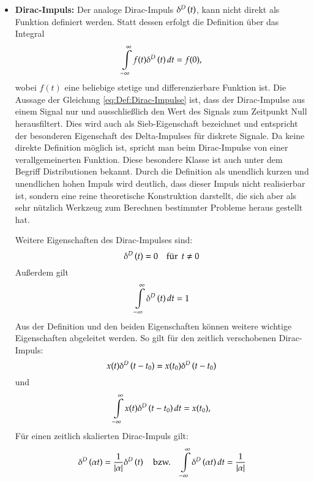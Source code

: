 \begin{itemize}
{    }
    \item{{\bf Dirac-Impuls:} Der analoge Dirac-Impuls $\Dirac{t}$,
kann nicht direkt als Funktion definiert werden. Statt dessen
erfolgt die Definition über das Integral
\begin{equation}\label{eq:Def:Dirac-Impulse}
   \int\limits_{-\infty}^{\infty}f(t)\Dirac{t} dt = f(0),
\end{equation}
wobei $f(t)$ eine beliebige stetige und differenzierbare Funktion
ist. Die Aussage der Gleichung \ref{eq:Def:Dirac-Impulse} ist, dass der Dirac-Impulse aus
einem Signal nur und ausschließlich den Wert des Signals zum
Zeitpunkt Null herausfiltert. Dies wird auch als Sieb-Eigenschaft
bezeichnet und entspricht der besonderen Eigenschaft des
Delta-Impulses für diskrete Signale. Da keine direkte Definition
möglich ist, spricht man beim Dirac-Impulse von einer
verallgemeinerten Funktion. Diese besondere Klasse ist auch unter
dem Begriff Distributionen bekannt. Durch die Definition als unendlich kurzen
und unendlichen hohen Impuls wird deutlich, dass dieser Impuls nicht
realisierbar ist, sondern eine reine theoretische Konstruktion darstellt, die
sich aber als sehr nützlich Werkzeug zum Berechnen bestimmter Probleme heraus gestellt hat.

Weitere Eigenschaften des Dirac-Impulses sind:
\begin{equation}\label{eq:Eigenschaft1:Dirac}
    \Dirac{t} = 0 \fuer t \neq 0
\end{equation}
Außerdem gilt
\begin{equation}\label{eq:Eigenschaft2:Dirac}
     \int\limits_{-\infty}^{\infty}\Dirac{t} dt = 1
\end{equation}
Aus der Definition und den beiden Eigenschaften können weitere
wichtige Eigenschaften abgeleitet werden. So gilt für den zeitlich
verschobenen Dirac-Impuls:
\begin{equation}\label{eq:Eigenschaft3:Dirac}
    x(t)\Dirac{t-t_0} = x(t_0)\Dirac{t-t_0}
\end{equation}
und
\begin{equation}\label{eq:Eigenschaft4:Dirac}
   \int\limits_{-\infty}^{\infty}x(t)\Dirac{t-t_0} dt = x(t_0),
\end{equation}
Für einen zeitlich skalierten Dirac-Impuls gilt:
\begin{equation}\label{eq:EigenschaftSkalierung:Dirac}
    \Dirac{\alpha t} = \frac{1}{|\alpha|}\Dirac{t} \quad
    \mbox{bzw.}\quad \int\limits_{-\infty}^{\infty}\Dirac{\alpha t} dt =
    \frac{1}{|\alpha|}
\end{equation}
    }
\end{itemize}

